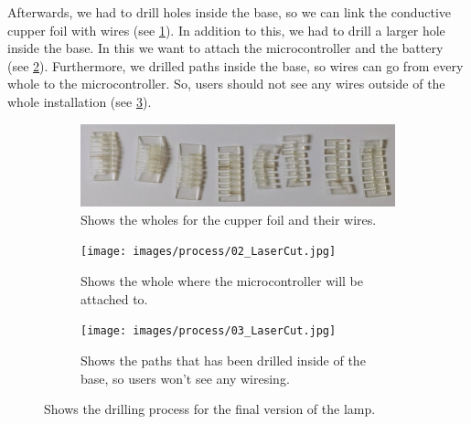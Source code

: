 \documentclass[00_doc.tex]{subfiles}
\begin{document}
    \noindent
    Afterwards, we had to drill holes inside the base, so we can link the conductive cupper foil 
    with wires (see \ref{fig:conductiveCupperFoilWithWires}). In addition to this, we had to 
    drill a larger hole inside the base. In this we want to attach the microcontroller and the 
    battery (see \ref{fig:holesForMicrocontroller}). Furthermore, we drilled paths inside the 
    base, so wires can go from every whole to the microcontroller. So, users should not see 
    any wires outside of the whole installation (see \ref{fig:drillPath}).

    \begin{figure}[H]
        \centering
        \begin{subfigure}{.45\textwidth}
        \centering
        \includegraphics[width=0.8\linewidth]{images/process/01_LaserCut.jpg}
        \caption{Shows the wholes for the cupper foil and their wires.}
        \label{fig:conductiveCupperFoilWithWires}
        \vspace{6mm}
        \end{subfigure}
        \medskip
        \hspace{1mm}
        \begin{subfigure}{.45\textwidth}
            \centering
            \texttt{[image: images/process/02\_LaserCut.jpg]}
            \caption{Shows the whole where the microcontroller will be attached to.}
            \label{fig:holesForMicrocontroller}
            \vspace{6mm}
        \end{subfigure}
        \hspace{1mm}
        \begin{subfigure}{.45\textwidth}
            \centering
            \texttt{[image: images/process/03\_LaserCut.jpg]}
            \caption{Shows the paths that has been drilled inside of the base, so 
            users won't see any wiresing.}
            \label{fig:drillPath}
            \vspace{6mm}
        \end{subfigure}
        \caption{Shows the drilling process for the final version of the lamp.}
        \label{fig:laserCutTests}
    \end{figure}
\end{document}
